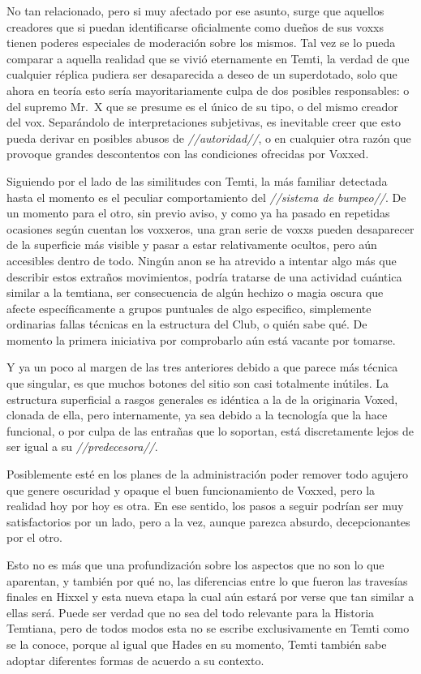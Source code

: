 \documentclass[
  spanish,
]{book}
\begin{document}
No tan relacionado, pero si muy afectado por ese asunto, surge que aquellos creadores que si puedan identificarse oficialmente como dueños de sus voxxs tienen poderes especiales de moderación sobre los mismos. Tal vez se lo pueda comparar a aquella realidad que se vivió eternamente en Temti, la verdad de que cualquier réplica pudiera ser desaparecida a deseo de un superdotado, solo que ahora en teoría esto sería mayoritariamente culpa de dos posibles responsables: o del supremo Mr.~X que se presume es el único de su tipo, o del mismo creador del vox. Separándolo de interpretaciones subjetivas, es inevitable creer que esto pueda derivar en posibles abusos de \emph{//autoridad//}, o en cualquier otra razón que provoque grandes descontentos con las condiciones ofrecidas por Voxxed.

Siguiendo por el lado de las similitudes con Temti, la más familiar detectada hasta el momento es el peculiar comportamiento del \emph{//sistema de bumpeo//}. De un momento para el otro, sin previo aviso, y como ya ha pasado en repetidas ocasiones según cuentan los voxxeros, una gran serie de voxxs pueden desaparecer de la superficie más visible y pasar a estar relativamente ocultos, pero aún accesibles dentro de todo. Ningún anon se ha atrevido a intentar algo más que describir estos extraños movimientos, podría tratarse de una actividad cuántica similar a la temtiana, ser consecuencia de algún hechizo o magia oscura que afecte específicamente a grupos puntuales de algo especifico, simplemente ordinarias fallas técnicas en la estructura del Club, o quién sabe qué. De momento la primera iniciativa por comprobarlo aún está vacante por tomarse.

Y ya un poco al margen de las tres anteriores debido a que parece más técnica que singular, es que muchos botones del sitio son casi totalmente inútiles. La estructura superficial a rasgos generales es idéntica a la de la originaria Voxed, clonada de ella, pero internamente, ya sea debido a la tecnología que la hace funcional, o por culpa de las entrañas que lo soportan, está discretamente lejos de ser igual a su \emph{//predecesora//}.

Posiblemente esté en los planes de la administración poder remover todo agujero que genere oscuridad y opaque el buen funcionamiento de Voxxed, pero la realidad hoy por hoy es otra. En ese sentido, los pasos a seguir podrían ser muy satisfactorios por un lado, pero a la vez, aunque parezca absurdo, decepcionantes por el otro.

Esto no es más que una profundización sobre los aspectos que no son lo que aparentan, y también por qué no, las diferencias entre lo que fueron las travesías finales en Hixxel y esta nueva etapa la cual aún estará por verse que tan similar a ellas será. Puede ser verdad que no sea del todo relevante para la Historia Temtiana, pero de todos modos esta no se escribe exclusivamente en Temti como se la conoce, porque al igual que Hades en su momento, Temti también sabe adoptar diferentes formas de acuerdo a su contexto.
\end{document}
